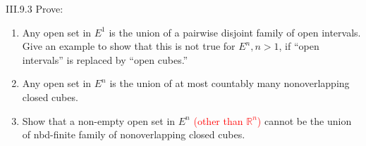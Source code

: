 \begin{problem}{III.9.3}
Prove:
\begin{enumerate}[label={(\alph*)}]
    \item Any open set in \(E^{1}\) is the union of a pairwise disjoint family of open intervals. Give an example to show that this is not true for \( E^{n}, n > 1 \), if ``open intervals'' is replaced by ``open cubes.\@''
    \item Any open set in \( E^{n} \) is the union of at most countably many nonoverlapping closed cubes.
    \item Show that a non-empty open set in \( E^{n} \) \textcolor{red}{(other than \( \mathbb{R}^{n} \))} cannot be the union of nbd-finite family of nonoverlapping closed cubes.
\end{enumerate}
\end{problem}

